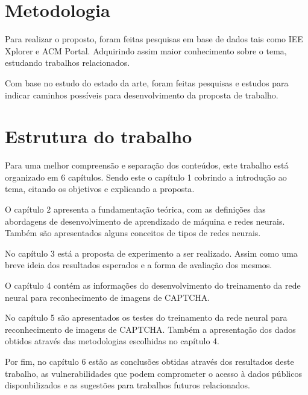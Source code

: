 \section{Metodologia}

Para realizar o proposto, foram feitas pesquisas em base de dados tais
como IEE Xplorer e ACM Portal. Adquirindo assim maior conhecimento
sobre o tema, estudando trabalhos relacionados. 

Com base no estudo do estado da arte, foram feitas pesquisas e
estudos para indicar caminhos possíveis para desenvolvimento da
proposta de trabalho.

\section{Estrutura do trabalho}

Para uma melhor compreensão e separação dos conteúdos, este trabalho
está organizado em 6 capítulos. Sendo este o capítulo 1 cobrindo a
introdução ao tema, citando os objetivos e explicando a proposta.

O capítulo 2 apresenta a fundamentação teórica, com as definições das
abordagens de desenvolvimento de aprendizado de máquina e redes
neurais. Também são apresentados alguns conceitos de tipos de redes
neurais.

No capítulo 3 está a proposta de experimento a ser realizado. Assim
como uma breve ideia dos resultados esperados e a forma de avaliação
dos mesmos.

O capítulo 4 contém as informações do desenvolvimento do treinamento
da rede neural para reconhecimento de imagens de CAPTCHA.

No capítulo 5 são apresentados os testes do treinamento da rede neural
para reconhecimento de imagens de CAPTCHA. Também a apresentação dos
dados obtidos através das metodologias escolhidas no capítulo 4.

Por fim, no capítulo 6 estão as conclusões obtidas através dos
resultados deste trabalho, as vulnerabilidades que podem comprometer o
acesso à dados públicos disponbilizados e as sugestões para trabalhos
futuros relacionados.